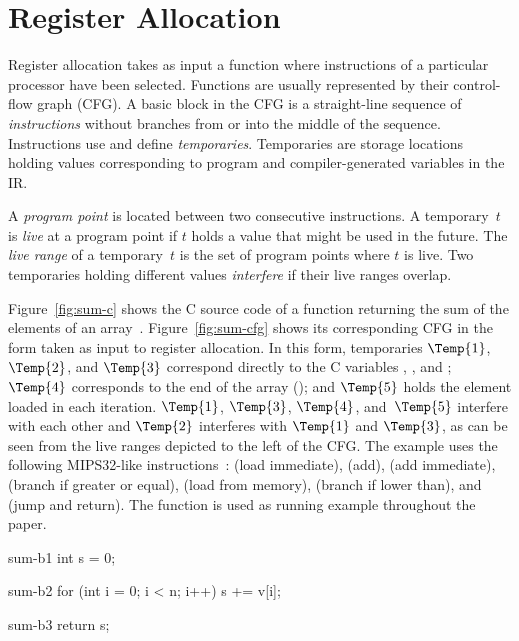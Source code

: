 \documentclass[acmsmall,authorversion,nonacm]{acmart}
\begin{document}
\section{Register Allocation}\label{sec:register-allocation}

Register allocation takes as input a function where instructions of a
particular processor have been selected.
Functions are usually represented by their control-flow graph (CFG).
A basic block in the CFG is a straight-line sequence of
\emph{instructions} without branches from or into the middle of the
sequence.
Instructions use and define \emph{temporaries}.
Temporaries are storage locations holding values corresponding to
program and compiler-generated variables in the IR.

A \emph{program point} is located between two consecutive instructions.
A temporary~$t$ is \emph{live} at a program point if $t$ holds a value
that might be used in the future.
The \emph{live range} of a temporary~$t$ is the set of program points
where $t$ is live.
Two temporaries holding different values \emph{interfere} if their
live ranges overlap.

Figure~\ref{fig:sum-c} shows the C source code of a function returning
the sum of the  elements of an array~.
Figure~\ref{fig:sum-cfg} shows its corresponding CFG in the form taken
as input to register allocation.
In this form, temporaries $\Temp{1}$, $\Temp{2}$, and $\Temp{3}$
correspond directly to the C variables , , and
; $\Temp{4}$ corresponds to the end of the array (); and $\Temp{5}$ holds the element loaded in each iteration.
$\Temp{1}$, $\Temp{3}$, $\Temp{4}$, and~$\Temp{5}$ interfere with each
other and $\Temp{2}$ interferes with $\Temp{1}$ and $\Temp{3}$, as
can be seen from the live ranges depicted to the left of the CFG.
The example uses the following MIPS32-like
instructions~\cite{Sweetman2006}:  (load immediate),
 (add),  (add immediate),  (branch if
greater or equal),  (load from memory),  (branch
if lower than), and  (jump and return).
The  function is used as running example throughout the paper.

\begin{SaveVerbatim}{sum-in}
int sum(char * v, int n) {
\end{SaveVerbatim}
\begin{SaveVerbatim}{sum-b1}
int s = 0;
\end{SaveVerbatim}
\begin{SaveVerbatim}{sum-b2}
for (int i = 0; i < n; i++) {
  s += v[i];
}
\end{SaveVerbatim}
\begin{SaveVerbatim}{sum-b3}
return s;
\end{SaveVerbatim}
\begin{SaveVerbatim}{sum-out}
}
\end{SaveVerbatim}
\end{document}
